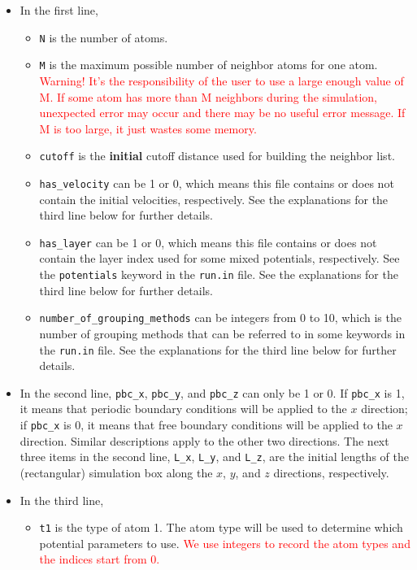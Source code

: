 \documentclass[12pt,a4paper]{report}
\begin{document}
\begin{itemize}
\item In the first line, 
\begin{itemize}
\item \verb"N" is the number of atoms.
\item \verb"M" is the maximum possible number of neighbor atoms for one atom. \textcolor{red}{Warning! It's the responsibility of the user to use a large enough value of M. If some atom has more than M neighbors during the simulation, unexpected error may occur and there may be no useful error message. If M is too large, it just wastes some memory. } 
\item \verb"cutoff" is the \textbf{initial} cutoff distance used for building the neighbor list. 
\item \verb"has_velocity" can be 1 or 0, which means this file contains or does not contain the initial velocities, respectively.  See the explanations for the third line below for further details.
\item \verb"has_layer" can be 1 or 0, which means this file contains or does not contain the layer index used for some mixed potentials, respectively. See the \verb"potentials" keyword in the \verb"run.in" file.  See the explanations for the third line below for further details.
\item \verb"number_of_grouping_methods" can be integers from 0 to 10, which is the number of grouping methods that can be referred to in some keywords in the \verb"run.in" file.  See the explanations for the third line below for further details.
\end{itemize}
\item In the second line, \verb"pbc_x",  \verb"pbc_y", and \verb"pbc_z" can only be 1 or 0. If \verb"pbc_x" is 1, it means that periodic boundary conditions will be applied to the $x$ direction; if \verb"pbc_x" is 0, it means that free boundary conditions will be applied to the $x$ direction. Similar descriptions apply to the other two directions. The next three items in the second line, \verb"L_x", \verb"L_y", and \verb"L_z", are the initial lengths of the (rectangular) simulation box along the $x$, $y$, and $z$ directions, respectively.
\item In the third line, 
\begin{itemize}
\item \verb"t1" is the type of atom 1. The atom type will be used to determine which potential parameters to use. \textcolor{red}{We use integers to record the atom types and the indices start from 0.}

\end{itemize}
\end{itemize}
\end{document}
